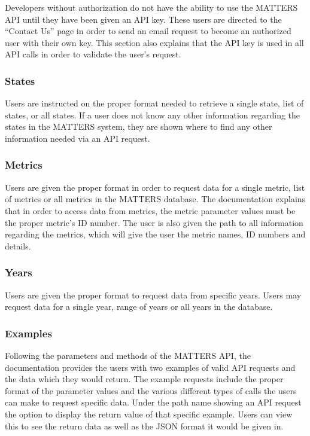 			Developers without authorization do not have the ability to use the MATTERS API until they have been given an API key. These users are directed to the “Contact Us” page in order to send an email request to become an authorized user with their own key. This section also explains that the API key is used in all API calls in order to validate the user's request.
			
			\subsubsection{States}
			
			Users are instructed on the proper format needed to retrieve a single state, list of states, or all states. If a user does not know any other information regarding the states in the MATTERS system, they are shown where to find any other information needed via an API request.
			
			\subsubsection{Metrics}
			
			Users are given the proper format in order to request data for a single metric, list of metrics or all metrics in the MATTERS database. The documentation explains that in order to access data from metrics, the metric parameter values must be the proper metric’s ID number. The user is also given the path to all information regarding the metrics, which will give the user the metric names, ID numbers and details.
			
			\subsubsection{Years}
			
			Users are given the proper format to request data from specific years. Users may request data for a single year, range of years or all years in the database. 
			
			\subsubsection{Examples}
			
			Following the parameters and methods of the MATTERS API, the documentation provides the users with two examples of valid API requests and the data which they would return. The example requests include the proper format of the parameter values and the various different types of calls the users can make to request specific data. Under the path name showing an API request the option to display the return value of that specific example. Users can view this to see the return data as well as the JSON format it would be given in. 
			


